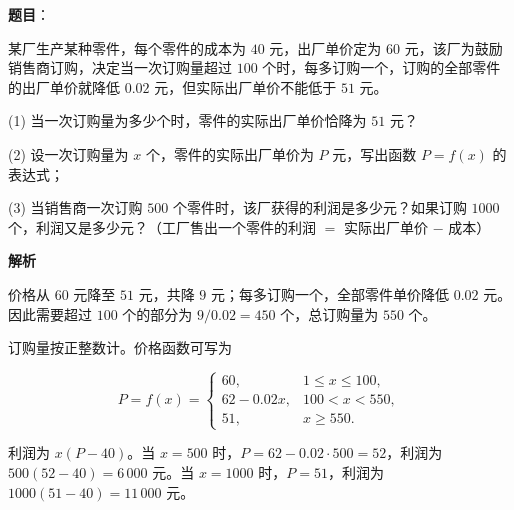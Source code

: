 \begin{answer}

\textbf{题目}：

某厂生产某种零件，每个零件的成本为 $40$ 元，出厂单价定为 $60$ 元，该厂为鼓励销售商订购，决定当一次订购量超过 $100$ 个时，每多订购一个，订购的全部零件的出厂单价就降低 $0.02$ 元，但实际出厂单价不能低于 $51$ 元。

(1) 当一次订购量为多少个时，零件的实际出厂单价恰降为 $51$ 元？

(2) 设一次订购量为 $x$ 个，零件的实际出厂单价为 $P$ 元，写出函数 $P=f(x)$ 的表达式；

(3) 当销售商一次订购 $500$ 个零件时，该厂获得的利润是多少元？如果订购 $1000$ 个，利润又是多少元？（工厂售出一个零件的利润 $=$ 实际出厂单价 $-$ 成本）

\textbf{解析}


价格从 $60$ 元降至 $51$ 元，共降 $9$ 元；每多订购一个，全部零件单价降低 $0.02$ 元。因此需要超过 $100$ 个的部分为 $9/0.02=450$ 个，总订购量为 $550$ 个。


订购量按正整数计。价格函数可写为

\nopagebreak[4]
\[
P=f(x)=
\begin{cases}
60,&1\le x\le100,\\
62-0.02x,&100<x<550,\\
51,&x\ge550.
\end{cases}
\]


利润为 $x(P-40)$。当 $x=500$ 时，$P=62-0.02\cdot500=52$，利润为 $500(52-40)=6\,000$ 元。当 $x=1000$ 时，$P=51$，利润为 $1000(51-40)=11\,000$ 元。




\end{answer}
